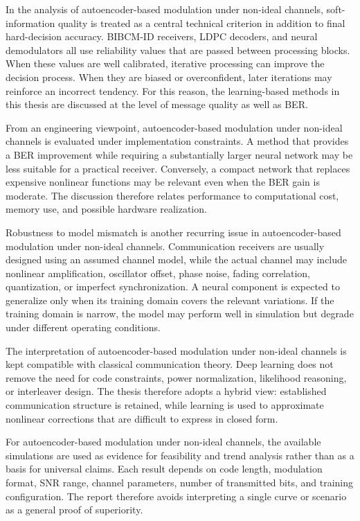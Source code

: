 In the analysis of autoencoder-based modulation under non-ideal channels, soft-information quality is treated as a central technical criterion in addition to final hard-decision accuracy. BIBCM-ID receivers, LDPC decoders, and neural demodulators all use reliability values that are passed between processing blocks. When these values are well calibrated, iterative processing can improve the decision process. When they are biased or overconfident, later iterations may reinforce an incorrect tendency. For this reason, the learning-based methods in this thesis are discussed at the level of message quality as well as BER.

From an engineering viewpoint, autoencoder-based modulation under non-ideal channels is evaluated under implementation constraints. A method that provides a BER improvement while requiring a substantially larger neural network may be less suitable for a practical receiver. Conversely, a compact network that replaces expensive nonlinear functions may be relevant even when the BER gain is moderate. The discussion therefore relates performance to computational cost, memory use, and possible hardware realization.

Robustness to model mismatch is another recurring issue in autoencoder-based modulation under non-ideal channels. Communication receivers are usually designed using an assumed channel model, while the actual channel may include nonlinear amplification, oscillator offset, phase noise, fading correlation, quantization, or imperfect synchronization. A neural component is expected to generalize only when its training domain covers the relevant variations. If the training domain is narrow, the model may perform well in simulation but degrade under different operating conditions.

The interpretation of autoencoder-based modulation under non-ideal channels is kept compatible with classical communication theory. Deep learning does not remove the need for code constraints, power normalization, likelihood reasoning, or interleaver design. The thesis therefore adopts a hybrid view: established communication structure is retained, while learning is used to approximate nonlinear corrections that are difficult to express in closed form.

For autoencoder-based modulation under non-ideal channels, the available simulations are used as evidence for feasibility and trend analysis rather than as a basis for universal claims. Each result depends on code length, modulation format, SNR range, channel parameters, number of transmitted bits, and training configuration. The report therefore avoids interpreting a single curve or scenario as a general proof of superiority.

